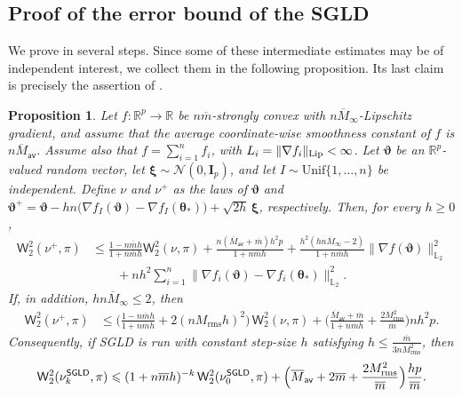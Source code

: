 \documentclass[aos,reqno]{imsart}
\newcommand\bxi{\boldsymbol\xi}
\newcommand\btheta{\boldsymbol\theta}
\newcommand\bvartheta{\boldsymbol\vartheta}
\def\wass{\mathsf{W}}
\def\Mtwo{M_{\mathrm{rms}}}
\def\mbar{\overline m}
\def\Mmaxbar{\overline M_{\infty}}
\def\Mavbar{\overline M_{\textsf{av}}}
\newtheorem{proposition}{Proposition}
\theoremstyle{definition}
\begin{document}
\subsection{Proof of the error bound of the SGLD}

We prove  in several steps. Since some 
of these intermediate estimates may be of independent 
interest, we collect them in the following proposition. 
Its last claim is precisely the assertion of 
.

\begin{proposition}\label{prop:th:sgld}
    Let $f:\mathbb R^p\to\mathbb R$ be $n\mbar$-strongly 
    convex with $n\Mmaxbar$-Lipschitz gradient, and 
    assume that the average coordinate-wise smoothness 
    constant of $f$ is $n\Mavbar$. Assume also that
    $f=\sum_{i=1}^n f_i$, with $L_i = \|\nabla f_i\|_{
    \rm Lip}<\infty$. Let $\bvartheta$ be an $\mathbb 
    R^p$-valued random vector, let $\bxi\sim\mathcal N(
    0,\mathbf I_p)$, and let $I\sim\mathrm{Unif}\{1, 
    \ldots,n\}$ be independent.
    Define $\nu$ and $\nu^+$ as the laws of $\bvartheta$
    and $\bvartheta^+  = \bvartheta - hn\big(\nabla 
    f_I(\bvartheta) - \nabla f_I(\btheta_*)\big) + 
    \sqrt{2h}\,\bxi$, respectively. Then, for every 
    $h\geqslant 0$, 
    \begin{align}
        \wass_2^2(\nu^+,\pi)
        &\leqslant
        \frac{1-n\mbar h}{1+n\mbar h}\wass_2^2(\nu,\pi)
        + \frac{n(\Mavbar+\mbar)h^2p}{1+n\mbar h}      
        + \frac{h^2(hn\Mmaxbar-2)}{1+n\mbar h}
        \|\nabla f(\bvartheta)\|_{\mathbb L_2}^2        \\
        &\qquad
        + nh^2\sum_{i=1}^n
        \big\|\nabla f_i(\bvartheta)
        -\nabla f_i(\btheta_*)\big\|_{\mathbb L_2}^2 .
        \label{claim-sgld-1}
    \end{align}
    If, in addition, $hn\Mmaxbar\leqslant 2$, then
    \begin{align}
        \wass_2^2(\nu^+,\pi)
        &\leqslant
        \Big(
        \frac{1-n\mbar h}{1+n\mbar h}
        +2(n\Mtwo h)^2\Big)\,
        \wass_2^2(\nu,\pi)    
        + \Big(\frac{\Mavbar+\mbar}{1+n\mbar h}
        + \frac{2\Mtwo^2}{\mbar}\Big)nh^2p.
        \label{claim-sgld-2}
    \end{align}
    Consequently, if SGLD is run with constant step-size
    $h$ satisfying $h \leqslant \frac{\mbar}{3n\Mtwo^2}$,
    then
    \begin{align}
        \wass_2^2(\nu_k^{\sf SGLD},\pi)
        \leqslant
        (1+n\mbar h)^{-k}\,
        \wass_2^2(\nu_0^{\sf SGLD},\pi)
        + \Big(\Mavbar+2\mbar
        +\frac{2\Mtwo^2}{\mbar}\Big)\frac{hp}{\mbar}.
        \label{claim-sgld-3}
    \end{align}
\end{proposition}
\end{document}
